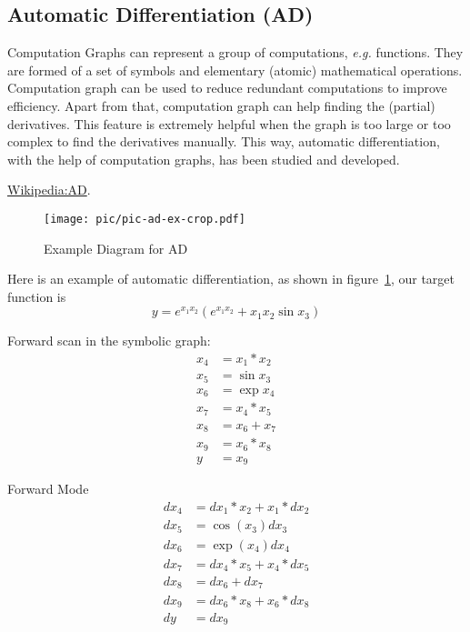 \subsection{Automatic Differentiation (AD)}


Computation Graphs can represent a group of computations,
{\it e.g.} functions. They are formed of a set of symbols and
elementary (atomic) mathematical operations. Computation graph
can be used to reduce redundant computations to improve
efficiency. Apart from that, computation graph can help
finding the (partial) derivatives. This feature is extremely
helpful when the graph is too large or too complex to find
the derivatives manually. This way, automatic differentiation,
with the help of computation graphs, has been studied and
developed.

\href{https://en.wikipedia.org/wiki/Automatic_differentiation}
{Wikipedia:AD}.

  \begin{figure}[!h]
   \centering
   \texttt{[image: pic/pic-ad-ex-crop.pdf]}
   \caption{Example Diagram for AD}
   \label{fig:pic-ad-ex}
  \end{figure}

Here is an example of automatic differentiation, as shown in figure~\ref{fig:pic-ad-ex},
our target function is
$$y=e^{x_1x_2}(e^{x_1x_2}+x_1x_2\sin x_3)$$

Forward scan in the symbolic graph:
\begin{align*}
	x_4 &= x_1 * x_2 \\
	x_5 &= \sin x_3 \\
	x_6 &= \exp x_4 \\
	x_7 &= x_4 * x_5 \\
	x_8 &= x_6 + x_7 \\
	x_9 &= x_6 * x_8 \\
	y   &= x_9
\end{align*}

Forward Mode
\begin{align*}
	dx_4 &= dx_1 * x_2 + x_1 * dx_2 \\
	dx_5 &= \cos(x_3) dx_3 \\
	dx_6 &= \exp(x_4) dx_4 \\
	dx_7 &= dx_4 * x_5 + x_4 * dx_5 \\
	dx_8 &= dx_6 + dx_7 \\
	dx_9 &= dx_6 * x_8 + x_6 * dx_8 \\
	dy   &= dx_9
\end{align*}

